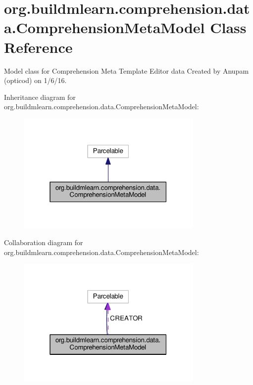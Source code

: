 \hypertarget{classorg_1_1buildmlearn_1_1comprehension_1_1data_1_1ComprehensionMetaModel}{}\section{org.\+buildmlearn.\+comprehension.\+data.\+Comprehension\+Meta\+Model Class Reference}
\label{classorg_1_1buildmlearn_1_1comprehension_1_1data_1_1ComprehensionMetaModel}


Model class for Comprehension Meta Template Editor data Created by Anupam (opticod) on 1/6/16.  




Inheritance diagram for org.\+buildmlearn.\+comprehension.\+data.\+Comprehension\+Meta\+Model\+:
\nopagebreak
\begin{figure}[H]
\begin{center}
\leavevmode
\includegraphics[width=256pt]{classorg_1_1buildmlearn_1_1comprehension_1_1data_1_1ComprehensionMetaModel__inherit__graph}
\end{center}
\end{figure}


Collaboration diagram for org.\+buildmlearn.\+comprehension.\+data.\+Comprehension\+Meta\+Model\+:
\nopagebreak
\begin{figure}[H]
\begin{center}
\leavevmode
\includegraphics[width=256pt]{classorg_1_1buildmlearn_1_1comprehension_1_1data_1_1ComprehensionMetaModel__coll__graph}
\end{center}
\end{figure}
